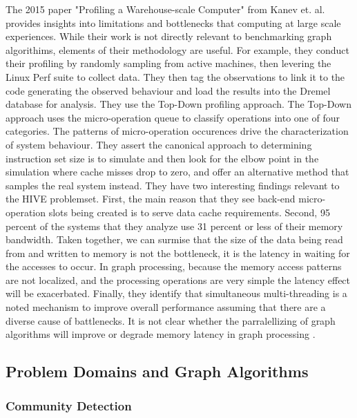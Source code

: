 \documentclass[sigconf,anonymous, authordraft]{acmart}
\begin{document}
\par{The 2015 paper "Profiling a Warehouse-scale Computer" from Kanev et. al. provides insights into limitations and bottlenecks that computing at large scale experiences. 
While their work is not directly relevant to benchmarking graph algorithims, elements of their methodology are useful. 
For example, they conduct their profiling by randomly sampling from active machines, then levering the Linux Perf suite to collect data.
They then tag the observations to link it to the code generating the observed behaviour and load the results into the Dremel database for analysis. 
They use the Top-Down profiling approach. 
The Top-Down approach uses the micro-operation queue to classify operations into one of four categories. 
The patterns of micro-operation occurences drive the characterization of system behaviour. 
They assert the canonical approach to determining instruction set size is to simulate and then look for the elbow point in the simulation where cache misses drop to zero, and offer an alternative method that samples the real system instead. 
They have two interesting findings relevant to the HIVE problemset. 
First, the main reason that they see back-end micro-operation slots being created is to serve data cache requirements. 
Second, 95 percent of the systems that they analyze use 31 percent or less of their memory bandwidth. 
Taken together, we can surmise that the size of the data being read from and written to memory is not the bottleneck, it is the latency in waiting for the accesses to occur. 
In graph processing, because the memory access patterns are not localized, and the processing operations are very simple the latency effect will be exacerbated. 
Finally, they identify that simultaneous multi-threading is a noted mechanism to improve overall performance assuming that there are a diverse cause of battlenecks. 
It is not clear whether the parralellizing of graph algorithms will improve or degrade memory latency in graph processing \cite{Kanev2015}.}

\subsection{Problem Domains and Graph Algorithms}

\subsubsection{Community Detection}
\end{document}
